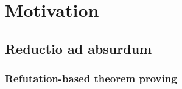 
\section{Motivation}

%	

\subsection{Reductio ad absurdum}

\begin{frame}
	\frametitle{Refutation-based theorem proving}
	
\end{frame}

\begin{frame}
	
\end{frame}
	
\begin{frame}
	
	
\end{frame}

\begin{frame}
	
\end{frame}
	

